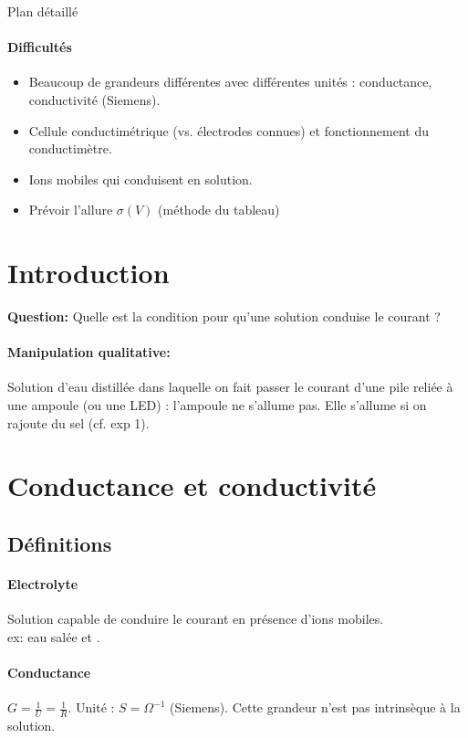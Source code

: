 \begin{reportBlock}{Plan détaillé}
\paragraph*{Difficultés}

\begin{itemize}
\item Beaucoup de grandeurs différentes avec différentes unités : conductance, conductivité (Siemens).
\item Cellule conductimétrique (vs. électrodes connues) et fonctionnement du conductimètre.
\item Ions mobiles qui conduisent en solution.
\item Prévoir l'allure $\sigma(V)$ (méthode du tableau)
\end{itemize}

\section*{Introduction}

\textbf{Question:} Quelle est la condition pour qu'une solution conduise le courant ?

\paragraph*{Manipulation qualitative:} Solution d'eau distillée dans laquelle on fait passer le courant d'une pile reliée à une ampoule (ou une LED) : l'ampoule ne s'allume pas. Elle s'allume si on rajoute du sel (cf. exp 1).

\section{Conductance et conductivité}

\subsection{Définitions}

\paragraph*{Electrolyte} Solution capable de conduire le courant en présence d'ions mobiles. \\
ex: eau salée  et .

\paragraph*{Conductance} $G = \frac{1}{U} = \frac{1}{R}$. Unité : $S = \Omega^{-1}$ (Siemens). Cette grandeur n'est pas intrinsèque à la solution.


\end{reportBlock}
